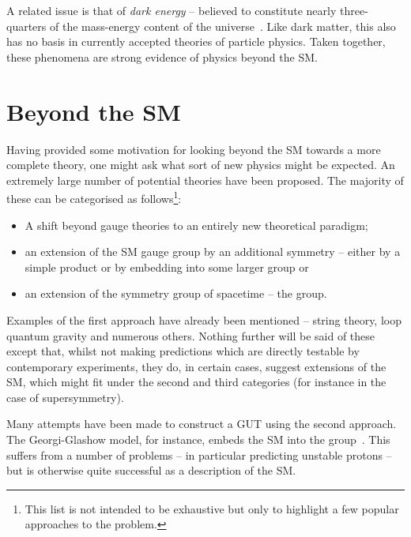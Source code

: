 A related issue is that of \emph{dark energy} -- believed to constitute nearly
three-quarters of the mass-energy content of the
universe~\cite{wmap_7year}. Like dark matter, this also has no basis in
currently accepted theories of particle physics. Taken together, these phenomena
are strong evidence of physics beyond the \ac{SM}.

\section{Beyond the \acl{SM}}
Having provided some motivation for looking beyond the \ac{SM} towards a more
complete theory, one might ask what sort of new physics might be expected. An
extremely large number of potential theories have been proposed. The majority of
these can be categorised as follows\footnote{This list is not intended to be
  exhaustive but only to highlight a few popular approaches to the problem.}:
\begin{itemize}
\item A shift beyond gauge theories to an entirely new theoretical paradigm;
\item an extension of the \ac{SM} gauge group by an additional symmetry -- either
  by a simple product or by embedding into some larger group or
\item an extension of the symmetry group of spacetime -- the \Poincare group.
\end{itemize}

Examples of the first approach have already been mentioned -- string theory, loop
quantum gravity and numerous others. Nothing further will be said of these
except that, whilst not making predictions which are directly testable by
contemporary experiments, they do, in certain cases, suggest extensions of the
\ac{SM}, which might fit under the second and third categories (for instance in
the case of supersymmetry).

Many attempts have been made to construct a \acl{GUT} using the second
approach. The Georgi-Glashow model, for instance, embeds the \ac{SM} into the
\SUfive group~\cite{georgi_glashow}. This suffers from a number of problems -- in
particular predicting unstable protons -- but is otherwise quite successful as a
description of the \ac{SM}.


